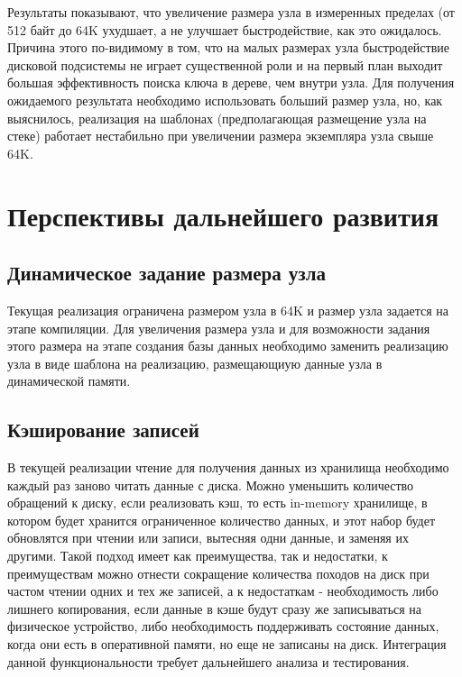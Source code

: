 \documentclass[14pt, russian]{scrartcl}
\begin{document}
Результаты показывают, что увеличение размера узла в измеренных пределах (от 512 байт до 64K ухудшает, а не улучшает быстродействие, как это ожидалось. Причина этого по-видимому в том, что на малых размерах узла быстродействие дисковой подсистемы не играет существенной роли и на первый план выходит большая эффективность поиска ключа в дереве, чем внутри узла. Для получения ожидаемого результата необходимо использовать больший размер узла, но, как выяснилось, реализация на шаблонах (предполагающая размещение узла на стеке) работает нестабильно при увеличении размера экземпляра узла свыше 64K.

\section{Перспективы дальнейшего развития}
\subsection{Динамическое задание размера узла}
Текущая реализация ограничена размером узла в 64K и размер узла задается на этапе компиляции. Для увеличения размера узла и для возможности задания этого размера на этапе создания базы данных необходимо заменить реализацию узла в виде шаблона на реализацию, размещающиую данные узла в динамической памяти.

\subsection{Кэширование записей}
В текущей реализации чтение для получения данных из хранилища необходимо каждый раз заново читать данные с диска. Можно уменьшить количество обращений к диску, если реализовать кэш, то есть in-memory хранилище, в котором будет хранится ограниченное количество данных, и этот набор будет обновлятся при чтении или записи, вытесняя одни данные, и заменяя их другими. Такой подход имеет как преимущества, так и недостатки, к преимуществам можно отнести сокращение количества походов на диск при частом чтении одних и тех же записей, а к недостаткам - необходимость либо лишнего копирования, если данные в кэше будут сразу же записываться на физическое устройство, либо необходимость поддерживать состояние данных, когда они есть в оперативной памяти, но еще не записаны на диск. Интеграция данной функциональности требует дальнейшего анализа и тестирования.
\end{document}
